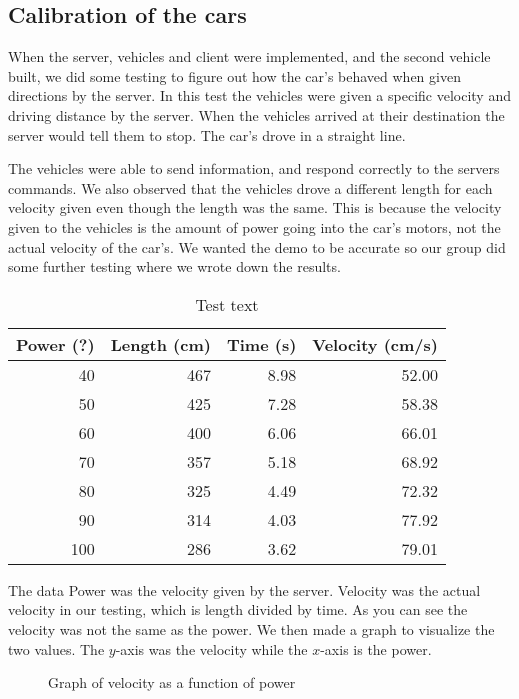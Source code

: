 \subsection{Calibration of the cars}
When the server, vehicles and client were implemented, and the second vehicle built, we did some testing to figure out how the car’s behaved when given directions by the server. In this test the vehicles were given a specific velocity and driving distance by the server. When the vehicles arrived at their destination the server would tell them to stop. The car’s drove in a straight line.

The vehicles were able to send information, and respond correctly to the servers commands. We also observed that the vehicles drove a different length for each velocity given even though the length was the same. This is because the velocity given to the vehicles is the amount of power going into the car’s motors, not the actual velocity of the car’s. We wanted the demo to be accurate so our group did some further testing where we wrote down the results. 

\begin{table}
	\begin{center}
		\begin{tabular}{rrrr}
			\hline
			Power (?) & Length (cm) & Time (s) & Velocity (cm/s) \\
			\hline
			40 & 467 & 8.98 & 52.00 \\
			50 & 425 & 7.28 & 58.38 \\
			60 & 400 & 6.06 & 66.01 \\
			70 & 357 & 5.18 & 68.92 \\
			80 & 325 & 4.49 & 72.32 \\
			90 & 314 & 4.03 & 77.92 \\
			100 & 286 & 3.62 & 79.01 \\
			\hline
		\end{tabular}
		\caption{Test text}
	\end{center}
\end{table}

The data Power was the velocity given by the server. Velocity was the actual velocity in our testing, which is length divided by time. As you can see the velocity was not the same as the power. We then made a graph to visualize the two values. The $y$-axis was the velocity while the $x$-axis is the power.

\begin{figure}[h!]
	\caption{Graph of velocity as a function of power}
\end{figure}

